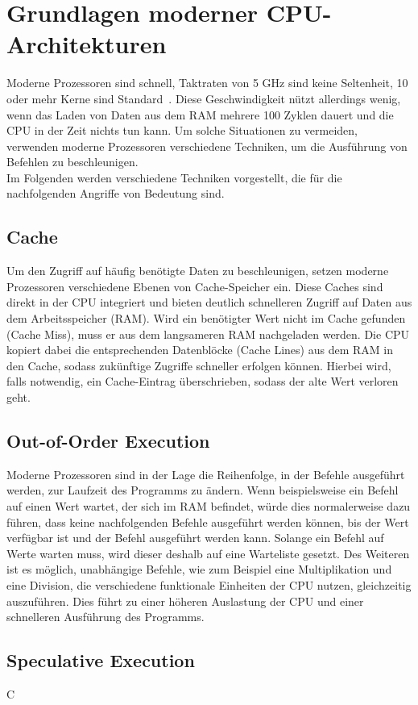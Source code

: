 \section{Grundlagen moderner CPU-Architekturen}
\label{sec:grundlagen-moderner-cpu-architekturen}

Moderne Prozessoren sind schnell, Taktraten von 5 GHz sind keine Seltenheit, 10 oder mehr Kerne sind Standard~\cite{ryzen_9}.
Diese Geschwindigkeit nützt allerdings wenig, wenn das Laden von Daten aus dem RAM mehrere 100 Zyklen dauert und die CPU in der Zeit nichts tun kann.
Um solche Situationen zu vermeiden, verwenden moderne Prozessoren verschiedene Techniken, um die Ausführung von Befehlen zu beschleunigen. \\
Im Folgenden werden verschiedene Techniken vorgestellt, die für die nachfolgenden Angriffe von Bedeutung sind.

\subsection{Cache}
\label{subsec:cache}

Um den Zugriff auf häufig benötigte Daten zu beschleunigen, setzen moderne Prozessoren verschiedene Ebenen von Cache-Speicher ein.
Diese Caches sind direkt in der CPU integriert und bieten deutlich schnelleren Zugriff auf Daten aus dem Arbeitsspeicher (RAM).
Wird ein benötigter Wert nicht im Cache gefunden (Cache Miss), muss er aus dem langsameren RAM nachgeladen werden.
Die CPU kopiert dabei die entsprechenden Datenblöcke (Cache Lines) aus dem RAM in den Cache, sodass zukünftige Zugriffe schneller erfolgen können.
Hierbei wird, falls notwendig, ein Cache-Eintrag überschrieben, sodass der alte Wert verloren geht.

\subsection{Out-of-Order Execution}
\label{subsec:out-of-order-execution}

Moderne Prozessoren sind in der Lage die Reihenfolge, in der Befehle ausgeführt werden, zur Laufzeit des Programms zu ändern.
Wenn beispielsweise ein Befehl auf einen Wert wartet, der sich im RAM befindet, würde dies normalerweise dazu führen, dass keine nachfolgenden Befehle ausgeführt werden können, bis der Wert verfügbar ist und der Befehl ausgeführt werden kann.
Solange ein Befehl auf Werte warten muss, wird dieser deshalb auf eine Warteliste gesetzt.
Des Weiteren ist es möglich, unabhängige Befehle, wie zum Beispiel eine Multiplikation und eine Division, die verschiedene funktionale Einheiten der CPU nutzen, gleichzeitig auszuführen.
Dies führt zu einer höheren Auslastung der CPU und einer schnelleren Ausführung des Programms.

\subsection{Speculative Execution}
\label{subsec:speculative-execution}

C